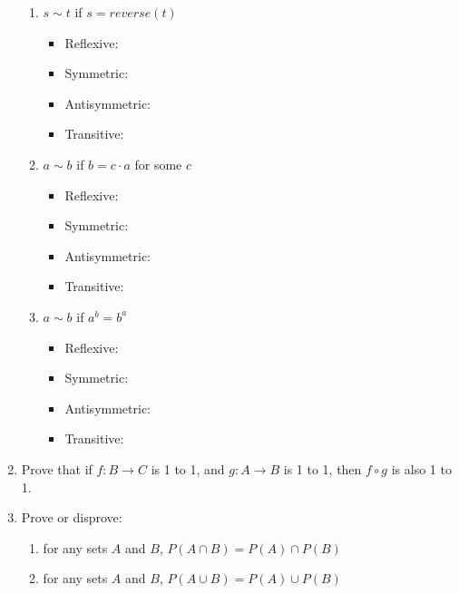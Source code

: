 \documentclass[basic, header]{nosvagor-notes}
\begin{document}
\begin{enumerate}[itemsep=5em]
\begin{enumerate}
      \item $s \sim t$ if $s = reverse(t)$
        \begin{itemize}
          \item Reflexive:
          \item Symmetric:
          \item Antisymmetric:
          \item Transitive:
        \end{itemize}

      \item $a \sim b$ if $b = c \cdot a$ for some $c$
        \begin{itemize}
          \item Reflexive:
          \item Symmetric:
          \item Antisymmetric:
          \item Transitive:
        \end{itemize}

      \item $a \sim b$ if $a^b = b^a$
        \begin{itemize}
          \item Reflexive:
          \item Symmetric:
          \item Antisymmetric:
          \item Transitive:
        \end{itemize}

    \end{enumerate}

  \newpage %

    \item Prove that if $f : B \to C$ is 1 to 1, and $g : A \to B$ is 1 to 1,
      then $f \circ g$ is also 1 to 1.

    \item Prove or disprove:
      \begin{enumerate}
        \item for any sets $A$ and $B$, $P(A\cap B) = P(A) \cap P(B)$

        \item for any sets $A$ and $B$, $P(A\cup B) = P(A) \cup P(B)$

      \end{enumerate}

  \newpage %


\end{enumerate}
\end{document}
